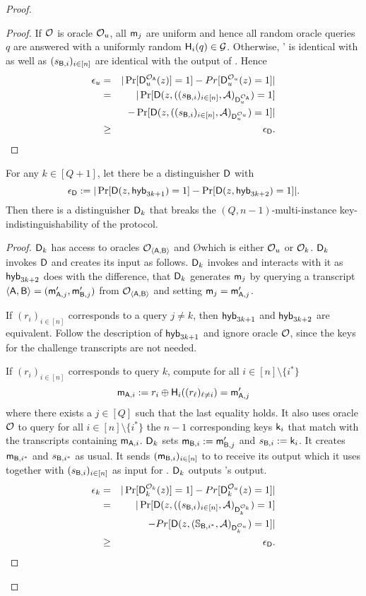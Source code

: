 \begin{proof}
\begin{proof}
If $\mathcal{O}$ is oracle $\mathcal{O}_{u}$, all $\mathsf{m}_j$ are uniform and hence all random oracle queries $q$ are answered with a uniformly random $\mathsf{H}_i(q)\in\mathcal{G}$.  Otherwise, \Adv' is identical with \send as well as $(s_{\mathsf{B},i})_{i\in[n]}$ are identical with the output of \send.  
Hence 
\begin{eqnarray*}
\epsilon_{u}&=&|\Pr[\mathsf D_u^{\mathcal{O}_{\mathsf{A}}}(z)]=1]-Pr[\mathsf D_u^{\mathcal{O}_{u}}(z)=1]|\\
&= &|\Pr[\mathsf D(z,((s_{\mathsf{B},i})_{i\in[n]},\mathcal{A})_{\mathsf D_u^{\mathcal{O}_{\mathsf{A}}}})=1]\\
&&-\Pr[\mathsf D(z,((s_{\mathsf{B},i})_{i\in[n]},\mathcal{A})_{\mathsf D_u^{\mathcal{O}_{u}}})=1]|\\
&\geq&\epsilon_{\mathsf D}.
\end{eqnarray*}
\pe
\end{proof}


\begin{claim}
For any $k\in[Q+1]$, let there be a distinguisher $\mathsf D$ with
$$
\epsilon_{\mathsf D}:=|\Pr[\mathsf D(z,\mathsf{hyb}_{3k+1})=1] -\Pr[\mathsf D(z,\mathsf{hyb}_{3k+2})=1]|.
$$
Then there is a distinguisher $\mathsf D_k$ that breaks the $(Q,n-1)$-multi-instance key-indistinguishability of the \UKA protocol.
\end{claim}

\begin{proof}
$\mathsf D_k$ has access to oracles $\mathcal{O}_{\langle \mathsf{A},\mathsf{B}\rangle}$ and \O which is either $\mathcal{O}_u$ or $\mathcal{O}_k$. $\mathsf D_k$ invokes $\mathsf D$ and creates its input as follows. $\mathsf D_k$ invokes \Adv and interacts with it as $\mathsf{hyb}_{3k+2}$ does with the difference, that $\mathsf D_k$ generates $\mathsf{m}_j$ by querying a transcript $\langle \mathsf{A}, \mathsf{B}\rangle=(\mathsf{m}_{\mathsf{A},j}',\mathsf{m}_{\mathsf{B},j}')$ from $\mathcal{O}_{\langle \mathsf{A},\mathsf{B}\rangle}$ and setting $\mathsf{m}_j=\mathsf{m}_{\mathsf{A},j}'$. 

If $(r_i)_{i\in[n]}$ corresponds to a query $j\neq k$, then $\mathsf{hyb}_{3k+1}$ and $\mathsf{hyb}_{3k+2}$ are equivalent. Follow the description of $\mathsf{hyb}_{3k+1}$ and ignore oracle $\mathcal{O}$, since the keys for the challenge transcripts are not needed.

If $(r_i)_{i\in[n]}$ corresponds to query $k$,
compute for all $i\in[n]\setminus\{i^*\}$
$$
\mathsf{m}_{\mathsf{A},i}:=r_i\oplus\mathsf{H}_i((r_{\ell})_{\ell\neq i})=\mathsf{m}_{\mathsf{A},j}'
$$
where there exists a $j\in[Q]$ such that the last equality holds. It also uses oracle $\mathcal{O}$ to query for all $i\in[n]\setminus\{i^*\}$ the $n-1$ corresponding keys $\mathsf{k}_i$ that match with the transcripts containing $\mathsf{m}_{\mathsf{A},i}$. $\mathsf D_k$ sets $\mathsf{m}_{\mathsf{B},i}:=\mathsf{m}_{\mathsf{B},j}'$ and $s_{\mathsf{B},i}:=\mathsf{k}_i$. It creates $\mathsf{m}_{\mathsf{B},i^*}$ and $s_{\mathsf{B},i^*}$ as usual. It sends $(\mathsf{m}_{\mathsf{B},i})_{i\in[n]}$ to \Adv to receive its output which it uses together with $(s_{\mathsf{B},i})_{i\in[n]}$ as input for \D. $\mathsf D_k$ outputs \D's output.  
\begin{eqnarray*}
\epsilon_{k}&=&|\Pr[\mathsf D_k^{\mathcal{O}_{k}}(z)]=1]-Pr[\mathsf D_k^{\mathcal{O}_{u}}(z)=1]|\\
&= &|\Pr[\mathsf D(z,((s_{\mathsf{B},i})_{i\in[n]},\mathcal{A})_{\mathsf D_k^{\mathcal{O}_{k}}})=1]\\
&&-Pr[\mathsf D(z,(\mathsf{\mathbb S}_{\mathsf{B},i^*},\mathcal{A})_{\mathsf D_k^{\mathcal{O}_{u}}})=1]|\\
&\geq&\epsilon_{\mathsf D}.
\end{eqnarray*}
\pe
\end{proof}


\end{proof}
